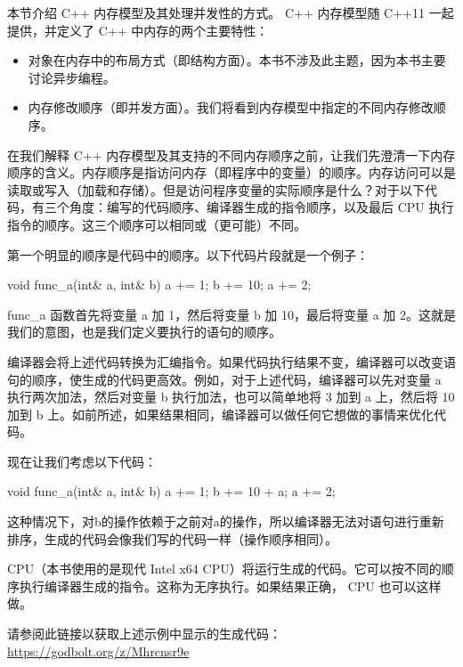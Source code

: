 
本节介绍 C++ 内存模型及其处理并发性的方式。 C++ 内存模型随 C++11 一起提供，并定义了 C++ 中内存的两个主要特性：

\begin{itemize}
\item
对象在内存中的布局方式（即结构方面）。本书不涉及此主题，因为本书主要讨论异步编程。

\item
内存修改顺序（即并发方面）。我们将看到内存模型中指定的不同内存修改顺序。
\end{itemize}


在我们解释 C++ 内存模型及其支持的不同内存顺序之前，让我们先澄清一下内存顺序的含义。内存顺序是指访问内存（即程序中的变量）的顺序。内存访问可以是读取或写入（加载和存储）。但是访问程序变量的实际顺序是什么？对于以下代码，有三个角度：编写的代码顺序、编译器生成的指令顺序，以及最后 CPU 执行指令的顺序。这三个顺序可以相同或（更可能）不同。

第一个明显的顺序是代码中的顺序。以下代码片段就是一个例子：

\begin{cpp}
void func_a(int& a, int& b) {
    a += 1;
    b += 10;
    a += 2;
}
\end{cpp}

func\_a 函数首先将变量 a 加 1，然后将变量 b 加 10，最后将变量 a 加 2。这就是我们的意图，也是我们定义要执行的语句的顺序。

编译器会将上述代码转换为汇编指令。如果代码执行结果不变，编译器可以改变语句的顺序，使生成的代码更高效。例如，对于上述代码，编译器可以先对变量 a 执行两次加法，然后对变量 b 执行加法，也可以简单地将 3 加到 a 上，然后将 10 加到 b 上。如前所述，如果结果相同，编译器可以做任何它想做的事情来优化代码。

现在让我们考虑以下代码：

\begin{cpp}
void func_a(int& a, int& b) {
    a += 1;
    b += 10 + a;
    a += 2;
}
\end{cpp}

这种情况下，对b的操作依赖于之前对a的操作，所以编译器无法对语句进行重新排序，生成的代码会像我们写的代码一样（操作顺序相同）。

CPU（本书使用的是现代 Intel x64 CPU）将运行生成的代码。它可以按不同的顺序执行编译器生成的指令。这称为无序执行。如果结果正确， CPU 也可以这样做。

请参阅此链接以获取上述示例中显示的生成代码： \url{https://godbolt.org/z/Mhrcnsr9e}


